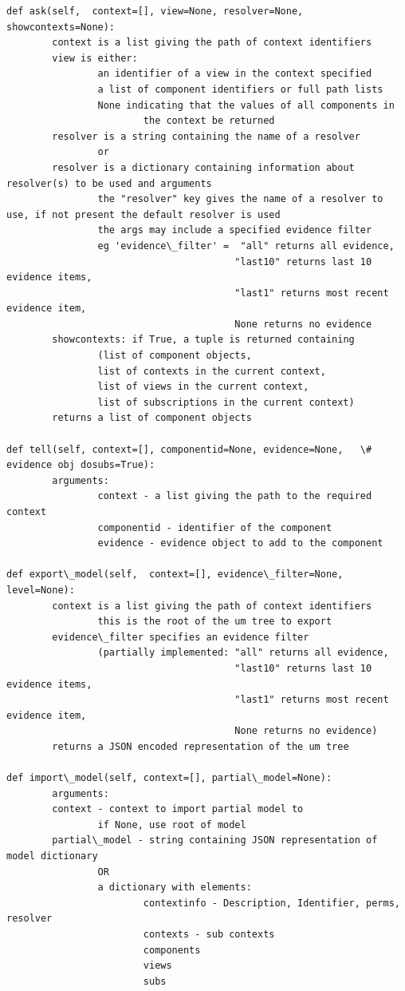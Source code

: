 \documentclass[letterpaper,10pt,english]{sphinxmanual}
\begin{document}
\begin{Verbatim}[commandchars=\\\{\}]
def ask(self,  context=[], view=None, resolver=None, showcontexts=None):
        context is a list giving the path of context identifiers
        view is either:
                an identifier of a view in the context specified
                a list of component identifiers or full path lists
                None indicating that the values of all components in
                        the context be returned
        resolver is a string containing the name of a resolver
                or
        resolver is a dictionary containing information about resolver(s) to be used and arguments
                the "resolver" key gives the name of a resolver to use, if not present the default resolver is used
                the args may include a specified evidence filter
                eg 'evidence\_filter' =  "all" returns all evidence,
                                        "last10" returns last 10 evidence items,
                                        "last1" returns most recent evidence item,
                                        None returns no evidence
        showcontexts: if True, a tuple is returned containing
                (list of component objects,
                list of contexts in the current context,
                list of views in the current context,
                list of subscriptions in the current context)
        returns a list of component objects

def tell(self, context=[], componentid=None, evidence=None,   \# evidence obj dosubs=True):
        arguments:
                context - a list giving the path to the required context
                componentid - identifier of the component
                evidence - evidence object to add to the component

def export\_model(self,  context=[], evidence\_filter=None, level=None):
        context is a list giving the path of context identifiers
                this is the root of the um tree to export
        evidence\_filter specifies an evidence filter
                (partially implemented: "all" returns all evidence,
                                        "last10" returns last 10 evidence items,
                                        "last1" returns most recent evidence item,
                                        None returns no evidence)
        returns a JSON encoded representation of the um tree

def import\_model(self, context=[], partial\_model=None):
        arguments:
        context - context to import partial model to
                if None, use root of model
        partial\_model - string containing JSON representation of model dictionary
                OR
                a dictionary with elements:
                        contextinfo - Description, Identifier, perms, resolver
                        contexts - sub contexts
                        components
                        views
                        subs


\end{Verbatim}
\end{document}

